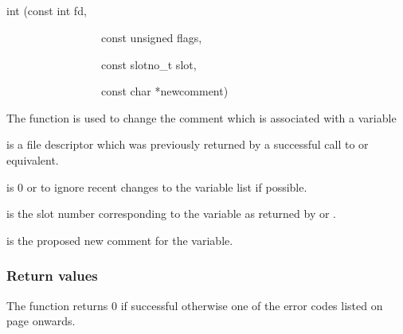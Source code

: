 \subsection{\funcnameXBvarchcomm{}}

\begin{expara}

int \funcnameXBvarchcomm{}(const int fd,

\ \ \ \ \ \ \ \ \ \ \ \ \ \ \ \ \ const unsigned flags,

\ \ \ \ \ \ \ \ \ \ \ \ \ \ \ \ \ const slotno\_t slot,

\ \ \ \ \ \ \ \ \ \ \ \ \ \ \ \ \ const char *newcomment)

\end{expara}

The function \funcXBvarchcomm{} is used to change the
comment which is associated with a variable

 is a file descriptor which was previously
returned by a successful call to \funcXBopen{} or equivalent.

 is 0 or
 to ignore recent changes to
the variable list if possible.

 is the slot number corresponding to the
variable as returned by \funcXBvarlist{} or
\funcXBvarfindslot{}.

 is the proposed new comment for the
variable.

\subsubsection{Return values}
The function returns 0 if successful otherwise one of the error codes
listed on page \pageref{errorcodes} onwards.

